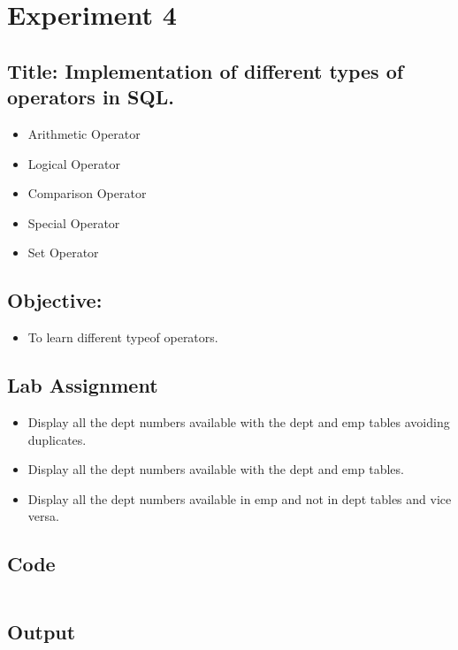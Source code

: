 \documentclass{article}
\begin{document}
\section*{Experiment 4}
\subsection*{\textbf{Title:} Implementation of different types of operators in SQL.}
\begin{itemize}
	\item Arithmetic Operator
	\item Logical Operator
	\item Comparison Operator
	\item Special Operator
	\item Set Operator
\end{itemize}
\subsection*{\textbf{Objective:}}
\begin{itemize}
	\item To learn different typeof operators.
\end{itemize}
\subsection*{Lab Assignment}
\begin{itemize}
	\item Display all the dept numbers available with the dept and emp tables avoiding duplicates.
	\item Display all the dept numbers available with the dept and emp tables.
	\item Display all the dept numbers available in emp and not in dept tables and vice versa.
\end{itemize}
\subsection*{Code}
\inputminted{sql}{code/4.sql}
\subsection*{Output}

\end{document}
